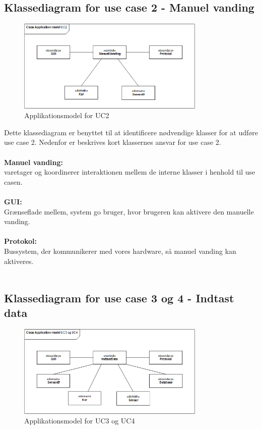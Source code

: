 \subsection{Klassediagram for use case 2 - Manuel vanding}
\begin{figure}[H]
    \centering
    \includegraphics[width=0.8\textwidth]{Systemarkitektur/KlasseDiagrammer/2_ManuelVanding.PNG}
    \caption{Applikationsmodel for UC2}
    \label{fig:app_uc2}
\end{figure}

Dette klassediagram er benyttet til at identificere nødvendige klasser for at udføre use case 2.
Nedenfor er beskrives kort klassernes ansvar for use case 2.
\\\\
\textbf{Manuel vanding:}\\
varetager og koordinerer interaktionen mellem de interne klasser i henhold til use casen.
\\\\
\textbf{GUI:}\\
Grænseflade mellem, system go bruger, hvor brugeren kan aktivere den manuelle vanding. 
\\\\
\textbf{Protokol:}\\
Bussystem, der kommunikerer med vores hardware, så manuel vanding kan aktiveres.
\\\\

\subsection{Klassediagram for use case 3 og 4 - Indtast data}

\begin{figure}[H]
    \centering
    \includegraphics[width=0.8\textwidth]{Systemarkitektur/KlasseDiagrammer/3+4_IndtastData.PNG}
    \caption{Applikationsmodel for UC3 og UC4}
    \label{fig:app_uc2}
\end{figure}

